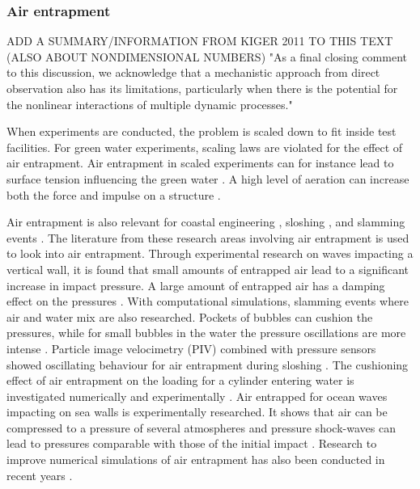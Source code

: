 \subsubsection{Air entrapment}
\label{sec:lit_air_entrapment}
ADD A SUMMARY/INFORMATION FROM KIGER 2011 TO THIS TEXT (ALSO ABOUT NONDIMENSIONAL NUMBERS) "As a final closing comment to this discussion, we acknowledge that a mechanistic approach
from direct observation also has its limitations, particularly when there is the potential for the nonlinear interactions of multiple dynamic processes." \par 
When experiments are conducted, the problem is scaled down to fit inside test facilities. 
For green water experiments, scaling laws are violated for the effect of air entrapment. Air entrapment in scaled experiments can for instance lead to surface tension influencing the green water \cite{Greco2005}. 
A high level of aeration can increase both the force and impulse on a structure \cite{Ariyarathne2012}. 
\par 
Air entrapment is also relevant for coastal engineering \cite{Chan1994}, sloshing \cite{Lugni2006}, and slamming events \cite{Guzel2019}. The literature from these research areas involving air entrapment is used to look into air entrapment. Through experimental research on waves impacting a vertical wall, it is found that small amounts of entrapped air lead to a significant increase in impact pressure. A large amount of entrapped air has a damping effect on the pressures \cite{Hattori1994}. With computational simulations, slamming events where air and water mix are also researched. Pockets of bubbles can cushion the pressures, while for small bubbles in the water the pressure oscillations are more intense \cite{Sun2019}. Particle image velocimetry (PIV) combined with pressure sensors showed oscillating behaviour for air entrapment during sloshing \cite{Lugni2006}. The cushioning effect of air entrapment on the loading for a cylinder entering water is investigated numerically and experimentally \cite{Guzel2019}. Air entrapped for ocean waves impacting on sea walls is experimentally researched. It shows that air can be compressed to a pressure of several atmospheres and pressure shock-waves can lead to pressures comparable with those of the initial impact \cite{Bredmose2009}. Research to improve numerical simulations of air entrapment has also been conducted in recent years \cite{Sun2019, VanDerEijk2020}.

